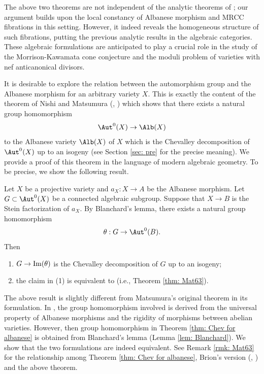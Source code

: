 \documentclass[11pt]{amsart}
\begin{document}
    The above two theorems are not independent of the analytic theorems of \cite{Cao19, CH19, MW23}; our argument builds upon the local constancy of Albanese morphism and MRCC fibrations in this setting. However, it indeed reveals the homogeneous structure of such fibrations, putting the previous analytic results in the algebraic categories. These algebraic formulations are anticipated to play a crucial role in the study of the Morrison-Kawamata cone conjecture and the moduli problem of varieties with nef anticanonical divisors.

    It is desirable to explore the relation between the automorphism group and the Albanese morphism for an arbitrary variety $X$. This is exactly the content of the theorem of Nishi and Matsumura (\cite[Theorem 2]{Mat63}, \cite[Theorem 5.5]{Fuj78}) which shows that there exists a natural group homomorphism 
    \[
    \Aut^0(X) \to \Alb(X)
    \] to the Albanese variety $\Alb(X)$ of $X$ which is the Chevalley decomposition of $\Aut^0(X)$ up to an isogeny (see Section \ref{sec: pre} for the precise meaning). We provide a proof of this theorem in the language of modern algebraic geometry. To be precise, we show the following result.
    
\begin{theorem}\label{thm: Chev for albanese}
    Let $X$ be a projective variety and $a_X: X \to A$ be the Albanese morphism. Let $G \subset \Aut^0(X)$ be a connected algebraic subgroup. Suppose that $X \to B$ is the Stein factorization of $a_X$. By Blanchard's lemma, there exists a natural group homomorphism
    \[
    \theta: G \to \Aut^0(B).
    \] Then 
    \begin{enumerate}
        \item $G \to {\rm Im}(\theta)$ is the Chevalley decomposition of $G$ up to an isogeny;
        \item the claim in (1) is equivalent to \cite[Theorem 2]{Mat63} (i.e., Theorem \ref{thm: Mat63}).
    \end{enumerate}
\end{theorem}

The above result is slightly different from Matsumura's original theorem in its formulation. In \cite[Theorem 2]{Mat63}, the group homomorphism involved is derived from the universal property of Albanese morphisms and the rigidity of morphisms between abelian varieties. However, then group homomorphism in Theorem \ref{thm: Chev for albanese} is obtained from Blanchard's lemma (Lemma \ref{lem: Blanchard}). We show that the two formulations are indeed equivalent. See Remark \ref{rmk: Mat63} for the relationship among Theorem \ref{thm: Chev for albanese}, Brion's version (\cite[Theorem 2]{Bri10}, \cite[Proposition 1.2]{Bri12}) and the above theorem.
\end{document}
